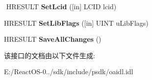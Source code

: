 \begin{DoxyCompactItemize}
$$\mbox{\label{interface_i_create_type_lib_af2d6670e6434cd5dc118dc340040493c}} 
H\+R\+E\+S\+U\+LT {\bfseries Set\+Lcid} (\mbox{[}in\mbox{]} L\+C\+ID lcid)
\item 
\mbox{\label{interface_i_create_type_lib_ab2022903b4a896015419ca9af9bef45e}} 
H\+R\+E\+S\+U\+LT {\bfseries Set\+Lib\+Flags} (\mbox{[}in\mbox{]} U\+I\+NT u\+Lib\+Flags)
\item 
\mbox{\label{interface_i_create_type_lib_aee9d07d5dc5e10d63a20fcd426e2b64d}} 
H\+R\+E\+S\+U\+LT {\bfseries Save\+All\+Changes} ()
\end{DoxyCompactItemize}


该接口的文档由以下文件生成\+:\begin{DoxyCompactItemize}
\item 
E\+:/\+React\+O\+S-\/0../sdk/include/psdk/oaidl.\+idl\end{DoxyCompactItemize}
